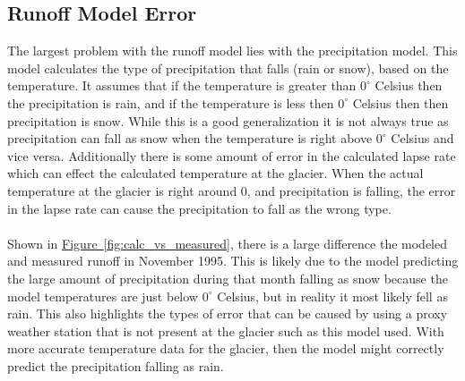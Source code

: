 \documentclass{article}
\begin{document}
\subsection{Runoff Model Error}
The largest problem with the runoff model lies with the precipitation model. This model calculates the type of precipitation that falls (rain or 
snow), based on the temperature. It assumes that if the temperature is greater than $0^\circ$ Celsius then the precipitation is rain, and if the 
temperature is less then $0^\circ$ Celsius then then precipitation is snow. While this is a good generalization it is not always true as precipitation 
can fall as snow when the temperature is right above $0^\circ$ Celsius and vice versa. 
Additionally there is some amount of error in the calculated lapse rate which 
can effect the calculated temperature at the glacier. When the actual temperature at the glacier is right around 0, and precipitation is falling, 
the error in the lapse rate can cause the precipitation to fall as the wrong type. 
\paragraph{}
Shown in \hyperref[fig:calc_vs_measured]{Figure~\ref*{fig:calc_vs_measured}}, there is a large difference the modeled and measured runoff in November 1995. This is likely due to the model predicting the large amount of precipitation 
during that month falling as snow because the model temperatures are just below $0^\circ$ Celsius, but in reality it most likely fell as rain. This also 
highlights the types of error that can be caused by using a proxy weather station that is not present at the glacier such as this model used. With 
more accurate temperature data for the glacier, then the model might correctly predict the precipitation falling as rain. 
\end{document}
